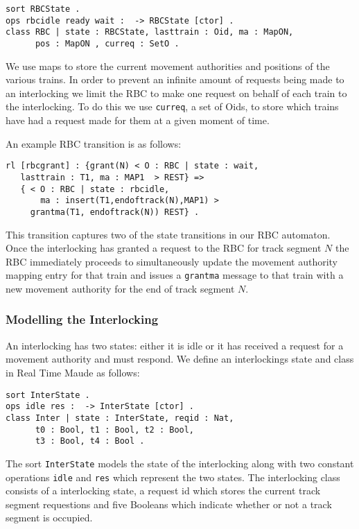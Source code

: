 \begin{lstlisting}[caption = The RBC state and class definition in Maude]
sort RBCState .
ops rbcidle ready wait :  -> RBCState [ctor] .
class RBC | state : RBCState, lasttrain : Oid, ma : MapON, 
      pos : MapON , curreq : SetO .
\end{lstlisting}

We use maps to store the current movement authorities and positions of the various trains. In order to prevent an infinite amount of requests being made to an interlocking we limit the RBC to make one request on behalf of each train to the interlocking.  To do this we use  \texttt{curreq}, a set of Oids, to store which trains have had a request made for them at a given moment of time.

An example RBC transition is as follows:
\begin{lstlisting}[caption = The state transition for the granting of a movement authority]
rl [rbcgrant] : {grant(N) < O : RBC | state : wait, 
   lasttrain : T1, ma : MAP1  > REST} => 
   { < O : RBC | state : rbcidle, 
       ma : insert(T1,endoftrack(N),MAP1) > 
     grantma(T1, endoftrack(N)) REST} .
\end{lstlisting}

This transition captures two of the state transitions in our RBC automaton. Once the interlocking has granted a request to the RBC for track segment $N$ the RBC immediately proceeds to simultaneously update the movement authority mapping entry for that train and issues a \texttt{grantma} message to that train with a new movement authority for the end of track segment $N$.

\subsubsection*{Modelling the Interlocking}
An interlocking has two states: either it is idle or it has received a request for a movement authority and must respond. We define an interlockings state and class in Real Time Maude as follows:

\begin{lstlisting}[caption = The interlocking class and states in Maude]
sort InterState .
ops idle res :  -> InterState [ctor] .
class Inter | state : InterState, reqid : Nat, 
      t0 : Bool, t1 : Bool, t2 : Bool, 
      t3 : Bool, t4 : Bool .
\end{lstlisting}

The sort \texttt{InterState} models the state of the interlocking along with two constant operations \texttt{idle} and \texttt{res} which represent the two states. The interlocking class consists of a interlocking state, a request id which stores the current track segment requestions and five Booleans which indicate whether or not a track segment is occupied. 

